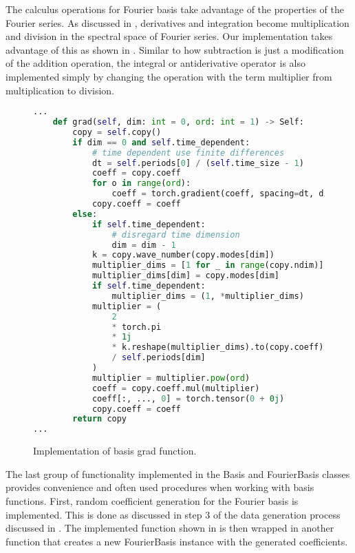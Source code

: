 The calculus operations for Fourier basis take advantage of the properties of the Fourier series. As discussed in , derivatives and integration become multiplication and division in the spectral space of Fourier series. Our implementation takes advantage of this as shown in . Similar to how subtraction is just a modification of the addition operation, the integral or antiderivative operator is also implemented simply by changing the operation with the term multiplier from multiplication to division.

\begin{figure}[H]
  \centering
  \begin{lstlisting}[language=Python]
...
    def grad(self, dim: int = 0, ord: int = 1) -> Self:
        copy = self.copy()
        if dim == 0 and self.time_dependent:
            # time dependent use finite differences
            dt = self.periods[0] / (self.time_size - 1)
            coeff = copy.coeff
            for o in range(ord):
                coeff = torch.gradient(coeff, spacing=dt, dim=1)[0]
            copy.coeff = coeff
        else:
            if self.time_dependent:
                # disregard time dimension
                dim = dim - 1
            k = copy.wave_number(copy.modes[dim])
            multiplier_dims = [1 for _ in range(copy.ndim)]
            multiplier_dims[dim] = copy.modes[dim]
            if self.time_dependent:
                multiplier_dims = (1, *multiplier_dims)
            multiplier = (
                2
                * torch.pi
                * 1j
                * k.reshape(multiplier_dims).to(copy.coeff)
                / self.periods[dim]
            )
            multiplier = multiplier.pow(ord)
            coeff = copy.coeff.mul(multiplier)
            coeff[:, ..., 0] = torch.tensor(0 + 0j)
            copy.coeff = coeff
        return copy
...
  \end{lstlisting}
  \caption{Implementation of basis grad function.}\label{fig:basis_grad_impl}
\end{figure}

The last group of functionality implemented in the Basis and FourierBasis classes provides convenience and often used procedures when working with basis functions. First, random coefficient generation for the Fourier basis is implemented. This is done as discussed in step 3 of the data generation process discussed in . The implemented function shown in  is then wrapped in another function that creates a new FourierBasis instance with the generated coefficients.

